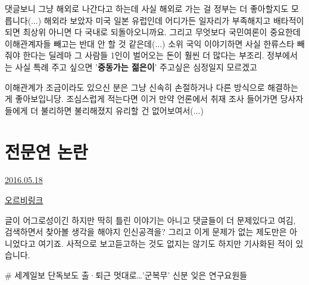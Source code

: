 댓글보니 그냥 해외로 나간다고 하는데 사실 해외로 가는 걸 정부는 더 좋아할지도 모릅니다(...)
해외라 보았자 미국 일본 유럽인데 어디가든 일자리가 부족해지고 배타적이 되면 최상위 아니면 다 국내로 되돌아오니까요.
그리고 무엇보다 국민여론이 중요한데 이해관계자들 빼고는 반대 안 할 것 같은데(...)
소위 국익 이야기하면 사실 한류스타 빼줘야 한다는 딜레마 그 사람들 1인이 벌어오는 돈이 훨씬 더 많다는 부조리.
정부에서는 사실 특례 주고 싶으면 '\textbf{중동가는 젊은이}' 주고싶은 심정일지 모르겠고
\vspace{5mm}

이해관계가 조금이라도 있으신 분은 그냥 신속히 손절하거나 다른 방식으로 해결하는 게 좋아보입니당.
조심스럽게 적는다면 이거 만약 언론에서 취재 조사 들어가면 당사자들에게 더 불리하면 불리해졌지 유리할 건 없어보여서(...)
\vspace{5mm}






\section{전문연 논란}
\href{https://www.kockoc.com/Apoc/779846}{2016.05.18}

\vspace{5mm}

\href{http://orbi.kr/bbs/board.php?bo_table=united&wr_id=8435509}{오르비링크}
\vspace{5mm}

글이 어그로성이긴 하지만 딱히 틀린 이야기는 아니고
댓글들이 더 문제있다고 여김, 검색하면서 찾아볼 생각을 해야지 인신공격을?
그리고 이게 문제가 없는 제도만은 아니었다고 여기죠.
사적으로 보고듣고하는 것도 없지는 않기도 하지만 기사화된 적이 있습니다.
\vspace{5mm}

$\#$ 세계일보 단독보도 출·퇴근 멋대로…'군복무' 신분 잊은 연구요원들
\vspace{5mm}

